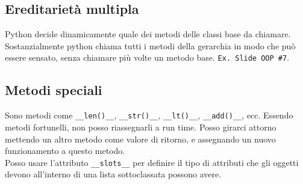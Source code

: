 \documentclass[a4paper,12pt]{article}
\begin{document}
\subsection{Ereditarietà multipla}
Python decide dinamicamente quale dei metodi delle classi base da chiamare. Sostanzialmente python chiama tutti i metodi della gerarchia in modo che può essere sensato, senza chiamare più volte un metodo base. \texttt{Ex. Slide OOP \#7}.

\subsection{Metodi speciali}
Sono metodi come \texttt{\_\_len()\_\_}, \texttt{\_\_str()\_\_}, \texttt{\_\_lt()\_\_}, \texttt{\_\_add()\_\_}, ecc. Essendo metodi fortunelli, non posso riassegnarli a run time. Posso girarci attorno mettendo un altro metodo come valore di ritorno, e assegnando un nuovo funzionamento a questo metodo.\\
Posso usare l'attributo \texttt{\_\_slots\_\_} per definire il tipo di attributi che gli oggetti devono all'interno di una lista sottoclassata possono avere.
\end{document}
